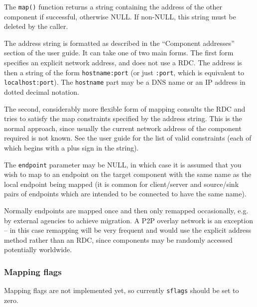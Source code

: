 \documentclass[12pt,a4paper,twoside]{article}
\renewcommand{\_}{\texttt{\symbol{95}}}
\begin{document}
The \verb^map()^ function returns a string containing the address of the
other component if successful, otherwise NULL. If non-NULL, this
string must be deleted by the caller.

The address string is formatted as described in the ``Component
addresses'' section of the user guide. It can take one of two
main forms.
The first form specifies an explicit network address, and does not
use a RDC.
The address is then a string of the form \verb^hostname:port^
(or just \verb^:port^, which is equivalent to \verb^localhost:port^).
The \verb^hostname^ part may be a DNS name or an IP address in
dotted decimal notation.

The second, considerably more flexible form of mapping
consults the RDC and tries to satisfy the map constraints
specified by the address string.
This is the normal approach, since usually the current network address
of the component required is not known.
See the user guide for the list of valid constraints (each of which
begins with a plus sign in the string).

The \verb^endpoint^ parameter may be NULL, in which case it is
assumed that you wish to map to an endpoint on the target component
with the same name as the local endpoint being mapped (it is common
for client/server and source/sink pairs of endpoints which are
intended to be connected to have the same name).

Normally endpoints are mapped once and then only remapped occasionally,
e.g. by external agencies to achieve migration. A P2P overlay network
is an exception -- in this case remapping will be very frequent
and would use the explicit address method rather than an RDC, since
components may be randomly accessed potentially worldwide.

\subsubsection{Mapping flags}

Mapping flags are not implemented yet, so currently \verb^sflags^
should be set to zero.

\end{document}
